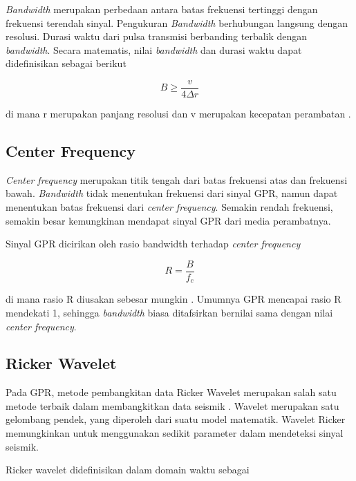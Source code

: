 \emph{Bandwidth} merupakan perbedaan antara batas frekuensi tertinggi dengan frekuensi terendah sinyal. 
Pengukuran \emph{Bandwidth} berhubungan langsung dengan resolusi. 
Durasi waktu dari pulsa transmisi berbanding terbalik dengan \emph{bandwidth}. 
Secara matematis, nilai \emph{bandwidth} dan durasi waktu dapat didefinisikan sebagai berikut

\begin{equation}
  \label{eq:BW}
  B \geq  \frac{v}{4 \Delta r} 
\end{equation}

di mana r merupakan panjang resolusi dan v merupakan kecepatan perambatan \parencite{jol2008ground}.

\subsection{Center Frequency}
\label{subsec:centerFrequency}

\emph{Center frequency} merupakan titik tengah dari batas frekuensi atas dan frekuensi bawah. 
\emph{Bandwidth} tidak menentukan frekuensi dari sinyal GPR, namun dapat menentukan batas frekuensi dari \emph{center frequency}.
Semakin rendah frekuensi, semakin besar kemungkinan mendapat sinyal GPR dari media perambatnya.

Sinyal GPR dicirikan oleh rasio bandwidth terhadap \emph{center frequency}

\begin{equation}
  \label{eq:cF}
  R =  \frac{B}{ f_{c} } 
\end{equation}

di mana rasio R diusakan sebesar mungkin \parencite{jol2008ground}. 
Umumnya GPR mencapai rasio R mendekati 1, sehingga \emph{bandwidth} biasa ditafsirkan bernilai sama dengan nilai \emph{center frequency}.

\subsection{Ricker Wavelet}
\label{subsec:rickerWavelet}

Pada GPR, metode pembangkitan data Ricker Wavelet merupakan salah satu metode terbaik dalam membangkitkan data seismik \parencite{rickeronSeismic}. 
Wavelet merupakan satu gelombang pendek, yang diperoleh dari suatu model matematik. 
Wavelet Ricker memungkinkan untuk menggunakan sedikit parameter dalam mendeteksi sinyal seismik.

Ricker wavelet didefinisikan dalam domain waktu sebagai


